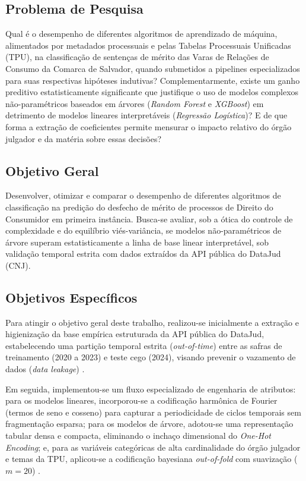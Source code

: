 \documentclass[conference]{IEEEtran}
\begin{document}
\subsection{Problema de Pesquisa}
Qual é o desempenho de diferentes algoritmos de aprendizado de máquina, alimentados por metadados processuais e pelas Tabelas Processuais Unificadas (TPU), na classificação de sentenças de mérito das Varas de Relações de Consumo da Comarca de Salvador, quando submetidos a pipelines especializados para suas respectivas hipóteses indutivas? Complementarmente, existe um ganho preditivo estatisticamente significante que justifique o uso de modelos complexos não-paramétricos baseados em árvores (\textit{Random Forest} e \textit{XGBoost}) em detrimento de modelos lineares interpretáveis (\textit{Regressão Logística})? E de que forma a extração de coeficientes permite mensurar o impacto relativo do órgão julgador e da matéria sobre essas decisões?

\subsection{Objetivo Geral}
Desenvolver, otimizar e comparar o desempenho de diferentes algoritmos de classificação na predição do desfecho de mérito de processos de Direito do Consumidor em primeira instância. Busca-se avaliar, sob a ótica do controle de complexidade e do equilíbrio viés-variância, se modelos não-paramétricos de árvore superam estatisticamente a linha de base linear interpretável, sob validação temporal estrita com dados extraídos da API pública do DataJud (CNJ).

\subsection{Objetivos Específicos}
Para atingir o objetivo geral deste trabalho, realizou-se inicialmente a extração e higienização da base empírica estruturada da API pública do DataJud, estabelecendo uma partição temporal estrita (\textit{out-of-time}) entre as safras de treinamento (2020 a 2023) e teste cego (2024), visando prevenir o vazamento de dados (\textit{data leakage}) \cite{hyndman2021}.

Em seguida, implementou-se um fluxo especializado de engenharia de atributos: para os modelos lineares, incorporou-se a codificação harmônica de Fourier (termos de seno e cosseno) para capturar a periodicidade de ciclos temporais sem fragmentação esparsa; para os modelos de árvore, adotou-se uma representação tabular densa e compacta, eliminando o inchaço dimensional do \textit{One-Hot Encoding}; e, para as variáveis categóricas de alta cardinalidade do órgão julgador e temas da TPU, aplicou-se a codificação bayesiana \textit{out-of-fold} com suavização ($m=20$) \cite{miccibarreca2001, izbicki2020}.
\end{document}
